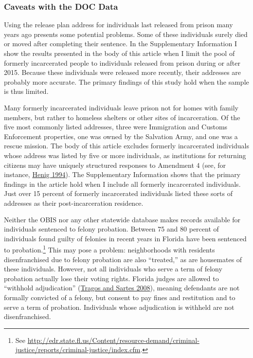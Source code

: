 \documentclass[
  12pt,
]{article}
\begin{document}
\hypertarget{caveats-with-the-doc-data}{%
\subsubsection*{Caveats with the DOC Data}\label{caveats-with-the-doc-data}}

Using the release plan address for individuals last released from prison many years ago presents some potential problems. Some of these individuals surely died or moved after completing their sentence. In the Supplementary Information I show the results presented in the body of this article when I limit the pool of formerly incarcerated people to individuals released from prison during or after 2015. Because these individuals were released more recently, their addresses are probably more accurate. The primary findings of this study hold when the sample is thus limited.

Many formerly incarcerated individuals leave prison not for homes with family members, but rather to homeless shelters or other sites of incarceration. Of the five most commonly listed addresses, three were Immigration and Customs Enforcement properties, one was owned by the Salvation Army, and one was a rescue mission. The body of this article excludes formerly incarcerated individuals whose address was listed by five or more individuals, as institutions for returning citizens may have uniquely structured responses to Amendment 4 (see, for instance, \protect\hyperlink{ref-Henig1994}{Henig 1994}). The Supplementary Information shows that the primary findings in the article hold when I include all formerly incarcerated individuals. Just over 15 percent of formerly incarcerated individuals listed these sorts of addresses as their post-incarceration residence.

Neither the OBIS nor any other statewide database makes records available for individuals sentenced to felony probation. Between 75 and 80 percent of individuals found guilty of felonies in recent years in Florida have been sentenced to probation.\footnote{See \url{http://edr.state.fl.us/Content/resource-demand/criminal-justice/reports/criminal-justice/index.cfm}.} This may pose a problem: neighborhoods with residents disenfranchised due to felony probation are also ``treated,'' as are housemates of these individuals. However, not all individuals who serve a term of felony probation actually lose their voting rights. Florida judges are allowed to ``withhold adjudication'' (\protect\hyperlink{ref-Tragos2008}{Tragos and Sartes 2008}), meaning defendants are not formally convicted of a felony, but consent to pay fines and restitution and to serve a term of probation. Individuals whose adjudication is withheld are not disenfranchised.
\end{document}
